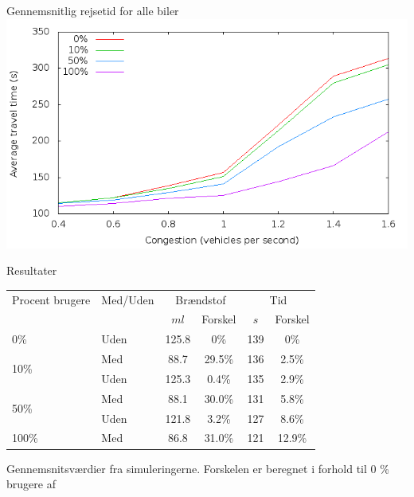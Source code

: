 \begin{frame}{Gennemsnitlig rejsetid for alle biler}
\includegraphics[width=1\textwidth]{../images/timeCongestion.png}
\end{frame}


\begin{frame}{Resultater}

\centering
\begin{tabular}{|l|l|cc|cc|}\hline
Procent brugere 			& Med/Uden & \multicolumn{2}{c|}{Brændstof} 	& \multicolumn{2}{c|}{Tid}\\
\tech					&\tech		& $ml$		& Forskel			&	$s$	& Forskel\\\hline
\multirow{1}{*}{0\%}	& Uden	&	125.8	&	0\%			&	139 & 0\%		\\\hline
\multirow{2}{*}{10\%}	& Med 		&	88.7	&	29.5\%		&	136 & 2.5\%		\\
						& Uden 	&	125.3	&	0.4\%		&	135 & 2.9\%		\\\hline
\multirow{2}{*}{50\%}	& Med		&	88.1	&	30.0\%		&	131 & 5.8\%		\\
						& Uden	&	121.8	&	3.2\%		&	127 & 8.6\%		\\\hline
\multirow{1}{*}{100\%}	& Med		&	86.8	&	31.0\%		&	121 & 12.9\%	\\\hline
\end{tabular}
Gennemsnitsværdier fra simuleringerne. Forskelen er beregnet i forhold til 0 \% brugere af \tech
\label{tb:TestResults:total}
\end{frame}